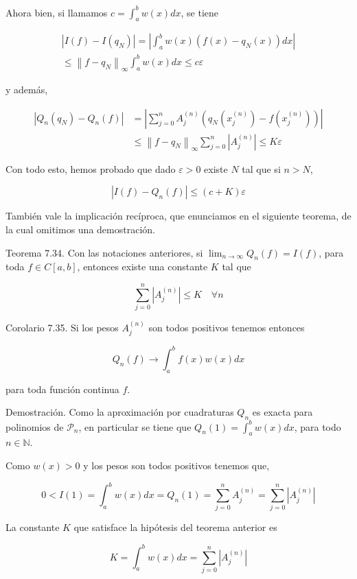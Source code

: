 \documentclass[10pt]{article}
\begin{document}
Ahora bien, si llamamos $c=\int_{a}^{b} w(x) d x$, se tiene

$$
\begin{gathered}
\left|I(f)-I\left(q_{N}\right)\right|=\left|\int_{a}^{b} w(x)\left(f(x)-q_{N}(x)\right) d x\right| \\
\leq\left\|f-q_{N}\right\|_{\infty} \int_{a}^{b} w(x) d x \leq c \varepsilon
\end{gathered}
$$

y además,

$$
\begin{aligned}
\left|Q_{n}\left(q_{N}\right)-Q_{n}(f)\right| & =\left|\sum_{j=0}^{n} A_{j}^{(n)}\left(q_{N}\left(x_{j}^{(n)}\right)-f\left(x_{j}^{(n)}\right)\right)\right| \\
& \leq\left\|f-q_{N}\right\|_{\infty} \sum_{j=0}^{n}\left|A_{j}^{(n)}\right| \leq K \varepsilon
\end{aligned}
$$

Con todo esto, hemos probado que dado $\varepsilon>0$ existe $N$ tal que si $n>N$,

$$
\left|I(f)-Q_{n}(f)\right| \leq(c+K) \varepsilon
$$

También vale la implicación recíproca, que enunciamos en el siguiente teorema, de la cual omitimos una demostración.

Teorema 7.34. Con las notaciones anteriores, si $\lim _{n \rightarrow \infty} Q_{n}(f)=I(f)$, para toda $f \in C[a, b]$, entonces existe una constante $K$ tal que

$$
\sum_{j=0}^{n}\left|A_{j}^{(n)}\right| \leq K \quad \forall n
$$

Corolario 7.35. Si los pesos $A_{j}^{(n)}$ son todos positivos tenemos entonces

$$
Q_{n}(f) \rightarrow \int_{a}^{b} f(x) w(x) d x
$$

para toda función continua $f$.

Demostración. Como la aproximación por cuadraturas $Q_{n}$ es exacta para polinomios de $\mathcal{P}_{n}$, en particular se tiene que $Q_{n}(1)=\int_{a}^{b} w(x) d x$, para todo $n \in \mathbb{N}$.

Como $w(x)>0$ y los pesos son todos positivos tenemos que,

$$
0<I(1)=\int_{a}^{b} w(x) d x=Q_{n}(1)=\sum_{j=0}^{n} A_{j}^{(n)}=\sum_{j=0}^{n}\left|A_{j}^{(n)}\right|
$$

La constante $K$ que satisface la hipótesis del teorema anterior es

$$
K=\int_{a}^{b} w(x) d x=\sum_{j=0}^{n}\left|A_{j}^{(n)}\right|
$$
\end{document}
